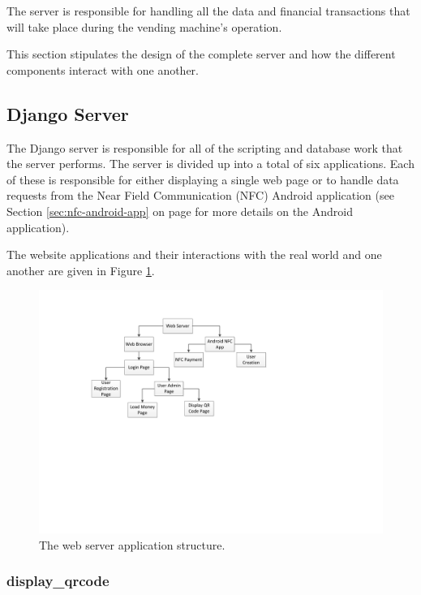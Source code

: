 The server is responsible for handling all the data and financial transactions
that will take place during the vending machine's operation. 

This section stipulates the design of the complete server and how the different
components interact with one another. 

\subsection{Django Server}

The Django server is responsible for all of the scripting and database work
that the server performs. The server is divided up into a total of six
applications. Each of these is responsible for either displaying a single web
page or to handle data requests from the Near Field Communication (NFC) Android
application (see Section \ref{sec:nfc-android-app} on page \pageref{sec:nfc-android-app}
for more details on the Android application).

The website applications and their interactions with the real world and one
another are given in Figure \ref{fig:website-apps}.

\begin{figure}
 \centering 
 \includegraphics[clip=true, trim = 0 280 0 70,
 scale=0.7]{website_structure}
 \caption{The web server application structure.}
 \label{fig:website-apps}
\end{figure}

\subsubsection{display\_qrcode}

